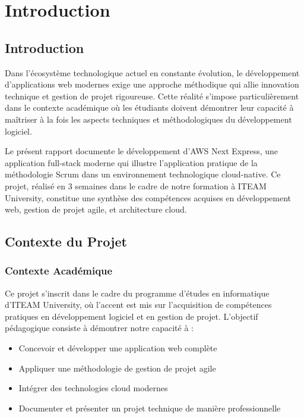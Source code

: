 \chapter{Introduction}

\section{Introduction}

Dans l'écosystème technologique actuel en constante évolution, le développement d'applications web modernes exige une approche méthodique qui allie innovation technique et gestion de projet rigoureuse. Cette réalité s'impose particulièrement dans le contexte académique où les étudiants doivent démontrer leur capacité à maîtriser à la fois les aspects techniques et méthodologiques du développement logiciel.

Le présent rapport documente le développement d'AWS Next Express, une application full-stack moderne qui illustre l'application pratique de la méthodologie Scrum dans un environnement technologique cloud-native. Ce projet, réalisé en 3 semaines dans le cadre de notre formation à ITEAM University, constitue une synthèse des compétences acquises en développement web, gestion de projet agile, et architecture cloud.

\section{Contexte du Projet}

\subsection{Contexte Académique}

Ce projet s'inscrit dans le cadre du programme d'études en informatique d'ITEAM University, où l'accent est mis sur l'acquisition de compétences pratiques en développement logiciel et en gestion de projet. L'objectif pédagogique consiste à démontrer notre capacité à :

\begin{itemize}
    \item Concevoir et développer une application web complète
    \item Appliquer une méthodologie de gestion de projet agile
    \item Intégrer des technologies cloud modernes
    \item Documenter et présenter un projet technique de manière professionnelle
\end{itemize}

